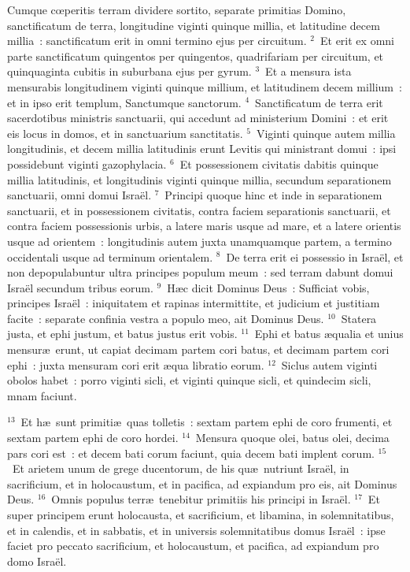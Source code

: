 \bchapter
\lettrine[lines=3,image=true,loversize=0.05,lraise=-0.03]{C}{}umque cœperitis terram dividere sortito, separate primitias Domino, sanctificatum de terra, longitudine viginti quinque millia, et latitudine decem millia~: sanctificatum erit in omni termino ejus per circuitum.
${}^{2}$~Et erit ex omni parte sanctificatum quingentos per quingentos, quadrifariam per circuitum, et quinquaginta cubitis in suburbana ejus per gyrum.
${}^{3}$~Et a mensura ista mensurabis longitudinem viginti quinque millium, et latitudinem decem millium~: et in ipso erit templum, Sanctumque sanctorum.
${}^{4}$~Sanctificatum de terra erit sacerdotibus ministris sanctuarii, qui accedunt ad ministerium Domini~: et erit eis locus in domos, et in sanctuarium sanctitatis.
${}^{5}$~Viginti quinque autem millia longitudinis, et decem millia latitudinis erunt Levitis qui ministrant domui~: ipsi possidebunt viginti gazophylacia.
${}^{6}$~Et possessionem civitatis dabitis quinque millia latitudinis, et longitudinis viginti quinque millia, secundum separationem sanctuarii, omni domui Isra\"el.
${}^{7}$~Principi quoque hinc et inde in separationem sanctuarii, et in possessionem civitatis, contra faciem separationis sanctuarii, et contra faciem possessionis urbis, a latere maris usque ad mare, et a latere orientis usque ad orientem~: longitudinis autem juxta unamquamque partem, a termino occidentali usque ad terminum orientalem.
${}^{8}$~De terra erit ei possessio in Isra\"el, et non depopulabuntur ultra principes populum meum~: sed terram dabunt domui Isra\"el secundum tribus eorum.
${}^{9}$~H\ae c dicit Dominus Deus~: Sufficiat vobis, principes Isra\"el~: iniquitatem et rapinas intermittite, et judicium et justitiam facite~: separate confinia vestra a populo meo, ait Dominus Deus.
${}^{10}$~Statera justa, et ephi justum, et batus justus erit vobis.
${}^{11}$~Ephi et batus \ae qualia et unius mensur\ae\ erunt, ut capiat decimam partem cori batus, et decimam partem cori ephi~: juxta mensuram cori erit \ae qua libratio eorum.
${}^{12}$~Siclus autem viginti obolos habet~: porro viginti sicli, et viginti quinque sicli, et quindecim sicli, mnam faciunt.


${}^{13}$~Et h\ae\ sunt primiti\ae\ quas tolletis~: sextam partem ephi de coro frumenti, et sextam partem ephi de coro hordei.
${}^{14}$~Mensura quoque olei, batus olei, decima pars cori est~: et decem bati corum faciunt, quia decem bati implent corum.
${}^{15}$~Et arietem unum de grege ducentorum, de his qu\ae\ nutriunt Isra\"el, in sacrificium, et in holocaustum, et in pacifica, ad expiandum pro eis, ait Dominus Deus.
${}^{16}$~Omnis populus terr\ae\ tenebitur primitiis his principi in Isra\"el.
${}^{17}$~Et super principem erunt holocausta, et sacrificium, et libamina, in solemnitatibus, et in calendis, et in sabbatis, et in universis solemnitatibus domus Isra\"el~: ipse faciet pro peccato sacrificium, et holocaustum, et pacifica, ad expiandum pro domo Isra\"el.


